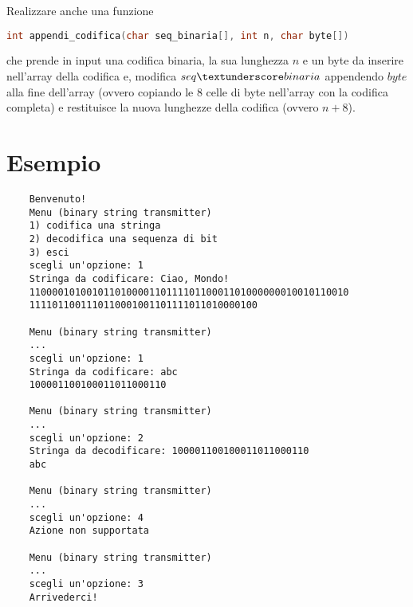 \documentclass[11pt,a4paper]{article}
\begin{document}
	\noindent Realizzare anche una funzione 
	\begin{lstlisting}[language=C++,xleftmargin=+\leftmargini]
	int appendi_codifica(char seq_binaria[], int n, char byte[])
	\end{lstlisting}
	che prende in input una codifica binaria, la sua lunghezza $n$ e un byte da inserire nell'array della codifica e, modifica $seq\textunderscore binaria$ appendendo $byte$ alla fine dell'array (ovvero copiando le 8 celle di byte nell'array con la codifica completa) e restituisce la nuova lunghezze della codifica (ovvero $n+8$).
	
	\pagebreak
	
	\section{Esempio}
	
	\begin{verbatim}
	Benvenuto!
	Menu (binary string transmitter)
	1) codifica una stringa
	2) decodifica una sequenza di bit
	3) esci
	scegli un'opzione: 1
	Stringa da codificare: Ciao, Mondo!
	11000010100101101000011011110110001101000000010010110010
	1111011001110110001001101111011010000100
	
	Menu (binary string transmitter)
	...
	scegli un'opzione: 1
	Stringa da codificare: abc
	100001100100011011000110
	
	Menu (binary string transmitter)
	...
	scegli un'opzione: 2
	Stringa da decodificare: 100001100100011011000110
	abc
	
	Menu (binary string transmitter)
	...
	scegli un'opzione: 4
	Azione non supportata
	
	Menu (binary string transmitter)
	...
	scegli un'opzione: 3
	Arrivederci!
	\end{verbatim}
	
\end{document}
